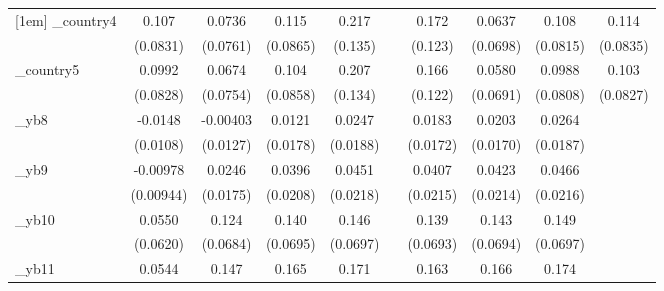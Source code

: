 \begin{table}[htbp]
\begin{tabular}{l*{9}{c}}
[1em]
\_country4   &       0.107         &      0.0736         &       0.115         &       0.217         &                     &       0.172         &      0.0637         &       0.108         &       0.114         \\
            &    (0.0831)         &    (0.0761)         &    (0.0865)         &     (0.135)         &                     &     (0.123)         &    (0.0698)         &    (0.0815)         &    (0.0835)         \\
[1em]
\_country5   &      0.0992         &      0.0674         &       0.104         &       0.207         &                     &       0.166         &      0.0580         &      0.0988         &       0.103         \\
            &    (0.0828)         &    (0.0754)         &    (0.0858)         &     (0.134)         &                     &     (0.122)         &    (0.0691)         &    (0.0808)         &    (0.0827)         \\
[1em]
\_yb8        &     -0.0148         &    -0.00403         &      0.0121         &      0.0247         &                     &      0.0183         &      0.0203         &      0.0264         &                     \\
            &    (0.0108)         &    (0.0127)         &    (0.0178)         &    (0.0188)         &                     &    (0.0172)         &    (0.0170)         &    (0.0187)         &                     \\
[1em]
\_yb9        &    -0.00978         &      0.0246         &      0.0396\sym{*}  &      0.0451\sym{**} &                     &      0.0407\sym{*}  &      0.0423\sym{**} &      0.0466\sym{**} &                     \\
            &   (0.00944)         &    (0.0175)         &    (0.0208)         &    (0.0218)         &                     &    (0.0215)         &    (0.0214)         &    (0.0216)         &                     \\
[1em]
\_yb10       &      0.0550         &       0.124\sym{*}  &       0.140\sym{**} &       0.146\sym{**} &                     &       0.139\sym{**} &       0.143\sym{**} &       0.149\sym{**} &                     \\
            &    (0.0620)         &    (0.0684)         &    (0.0695)         &    (0.0697)         &                     &    (0.0693)         &    (0.0694)         &    (0.0697)         &                     \\
[1em]
\_yb11       &      0.0544         &       0.147\sym{*}  &       0.165\sym{**} &       0.171\sym{**} &                     &       0.163\sym{**} &       0.166\sym{**} &       0.174\sym{**} &                     \\

\end{tabular}
\end{table}
